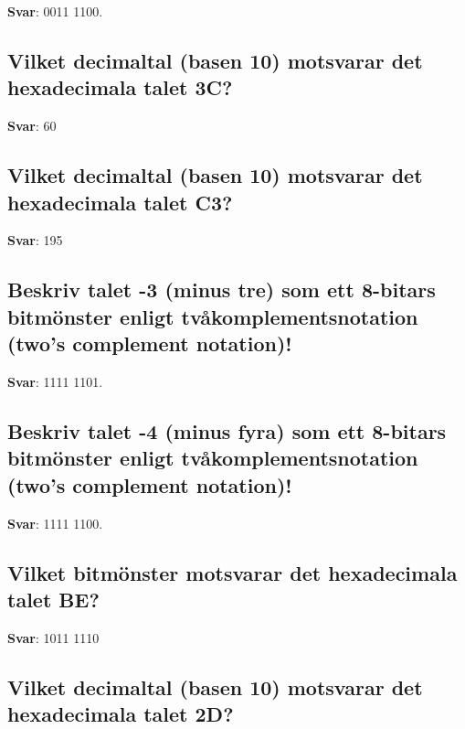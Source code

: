 \documentclass[a4paper,11pt,oneside]{article}
\begin{document}
\begin{sloppypar}
\label{q:389:sa:sv:True}

\textbf{Svar}: 0011 1100.



\subsection{Vilket decimaltal (basen 10) motsvarar det hexadecimala talet 3C?}

\label{q:390:sa:sv:True}

\textbf{Svar}: 60



\subsection{Vilket decimaltal (basen 10) motsvarar det hexadecimala talet C3?}

\label{q:391:sa:sv:True}

\textbf{Svar}: 195



\subsection{Beskriv talet -3 (minus tre) som ett 8-bitars bitm\"onster enligt tv\r{a}komplementsnotation (two{\textquoteright}s complement notation)!}

\label{q:392:sa:sv:True}

\textbf{Svar}: 1111 1101.



\subsection{Beskriv talet -4 (minus fyra) som ett 8-bitars bitm\"onster enligt tv\r{a}komplementsnotation (two{\textquoteright}s complement notation)!}

\label{q:393:sa:sv:True}

\textbf{Svar}: 1111 1100.



\subsection{Vilket bitm\"onster motsvarar det hexadecimala talet BE?}

\label{q:394:sa:sv:True}

\textbf{Svar}: 1011 1110



\subsection{Vilket decimaltal (basen 10) motsvarar det hexadecimala talet 2D?}


\end{sloppypar}
\end{document}
